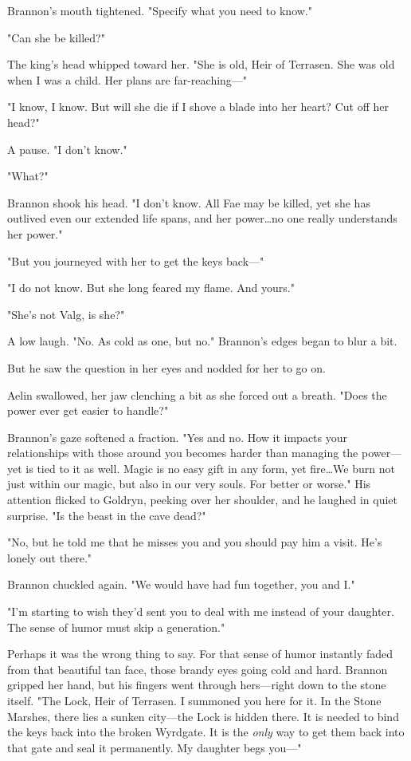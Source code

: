 Brannon's mouth tightened.
"Specify what you need to know."

"Can she be killed?"

The king's head whipped toward her.
"She is old, Heir of Terrasen.
She was old when I was a child.
Her plans are far-reaching---"

"I know, I know.
But will she die if I shove a blade into her heart?
Cut off her head?"

A pause.
"I don't know."

"What?"

Brannon shook his head.
"I don't know.
All Fae may be killed, yet she has outlived even our extended life spans, and her power\ldots no one really understands her power."

"But you journeyed with her to get the keys back---"

"I do not know.
But she long feared my flame.
And yours."

"She's not Valg, is she?"

A low laugh.
"No.
As cold as one, but no."
Brannon's edges began to blur a bit.

But he saw the question in her eyes and nodded for her to go on.

Aelin swallowed, her jaw clenching a bit as she forced out a breath.
"Does the power ever get easier to handle?"

Brannon's gaze softened a fraction.
"Yes and no.
How it impacts your relationships with those around you becomes harder than managing the power--- yet is tied to it as well.
Magic is no easy gift in any form, yet fire\ldots We burn not just within our magic, but also in our very souls.
For better or worse."
His attention flicked to Goldryn, peeking over her shoulder, and he laughed in quiet surprise.
"Is the beast in the cave dead?"

"No, but he told me that he misses you and you should pay him a visit.
He's lonely out there."

Brannon chuckled again.
"We would have had fun together, you and I."

"I'm starting to wish they'd sent you to deal with me instead of your daughter.
The sense of humor must skip a generation."

Perhaps it was the wrong thing to say.
For that sense of humor instantly faded from that beautiful tan face, those brandy eyes going cold and hard.
Brannon gripped her hand, but his fingers went through hers---right down to the stone itself.
"The Lock, Heir of Terrasen.
I summoned you here for it.
In the Stone Marshes, there lies a sunken city---the Lock is hidden there.
It is needed to bind the keys back into the broken Wyrdgate.
It is the \emph{only} way to get them back into that gate and seal it permanently.
My daughter begs you---"

